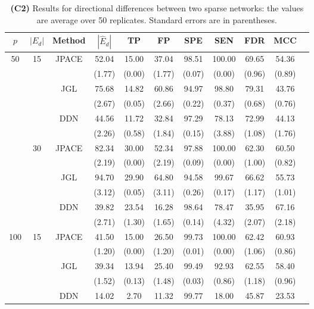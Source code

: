 \documentclass[useAMS,usenatbib,referee]{bio}
\begin{document}
{{\begin{table}[htb!]
\caption{{\bf (C2)} Results for directional differences between two sparse
networks: the values are average over 50 replicates.
Standard errors are in parentheses.}
\medskip
\centering
{ %
\begin{tabular}{||c|c|c||c|c|c|c|c|c|c||c} \cline{1-10}
$p$  &  $|E_d|$  & Method & $|\hat{E}_d|$ & TP & FP & SPE & SEN & FDR & MCC \\ \hline 
\multirow{12}{*}{50}  &\multirow{6}{*}{15}  & \multirow{2}{*}{JPACE} &52.04 & 15.00 & 37.04 & 98.51 & 100.00 & 69.65 & 54.36 \\ 
& & & (1.77) & (0.00) & (1.77) & (0.07) & (0.00) & (0.96) & (0.89) \\ \cline{3-10} 
& & \multirow{2}{*}{JGL} & 75.68 & 14.82 & 60.86 & 94.97 & 98.80 & 79.31 & 43.76 \\ 
 & & & (2.67) & (0.05) & (2.66) & (0.22) & (0.37) & (0.68) & (0.76) \\ \cline{3-10} 
& & \multirow{2}{*}{DDN} & 44.56 & 11.72 & 32.84 & 97.29 & 78.13 & 72.99 & 44.13 \\ 
 & & & (2.26) & (0.58) & (1.84) & (0.15) & (3.88) & (1.08) & (1.76) \\\cline{2-10} 
  &\multirow{6}{*}{30}  & \multirow{2}{*}{JPACE} &82.34 & 30.00 & 52.34 & 97.88 & 100.00 & 62.30 & 60.50 \\ 
& & & (2.19) & (0.00) & (2.19) & (0.09) & (0.00) & (1.00) & (0.82) \\ \cline{3-10} 
& & \multirow{2}{*}{JGL} & 94.70 & 29.90 & 64.80 & 94.58 & 99.67 & 66.62 & 55.73 \\ 
 & & & (3.12) & (0.05) & (3.11) & (0.26) & (0.17) & (1.17) & (1.01) \\ \cline{3-10} 
& & \multirow{2}{*}{DDN} & 39.82 & 23.54 & 16.28 & 98.64 & 78.47 & 35.95 & 67.16 \\ 
 & & & (2.71) & (1.30) & (1.65) & (0.14) & (4.32) & (2.07) & (2.18) \\\cline{1-10} 
\multirow{12}{*}{100}  &\multirow{6}{*}{15}  & \multirow{2}{*}{JPACE} &41.50 & 15.00 & 26.50 & 99.73 & 100.00 & 62.42 & 60.93 \\ 
& & & (1.20) & (0.00) & (1.20) & (0.01) & (0.00) & (1.06) & (0.86) \\ \cline{3-10} 
& & \multirow{2}{*}{JGL} & 39.34 & 13.94 & 25.40 & 99.49 & 92.93 & 62.55 & 58.40 \\ 
 & & & (1.52) & (0.13) & (1.48) & (0.03) & (0.86) & (1.18) & (0.96) \\ \cline{3-10} 
& & \multirow{2}{*}{DDN} & 14.02 & 2.70 & 11.32 & 99.77 & 18.00 & 45.87 & 23.53 \\ 

\end{tabular}}
\end{table}}}
\end{document}
